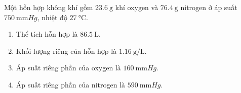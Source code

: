 \begin{ex}
Một hỗn hợp không khí gồm $\SI{23.6}{\gram}$ khí oxygen và $\SI{76.4}{\gram}$ nitrogen ở áp suất $\SI{750}{\milli\meter Hg}$, nhiệt độ $\SI{27}{\celsius}$.
\begin{enumerate}[label=\alph*)]
	\item Thể tích hỗn hợp là $\SI{86.5}{\liter}$.
	\item  Khối lượng riêng của hỗn hợp là $\SI{1.16}{\gram/\liter}$.
	\item Áp suất riêng phần của oxygen là $\SI{160}{\milli\meter Hg}$.
	\item Áp suất riêng phần của nitrogen là $\SI{590}{\milli\meter Hg}$.
\end{enumerate}
	
\end{ex}
